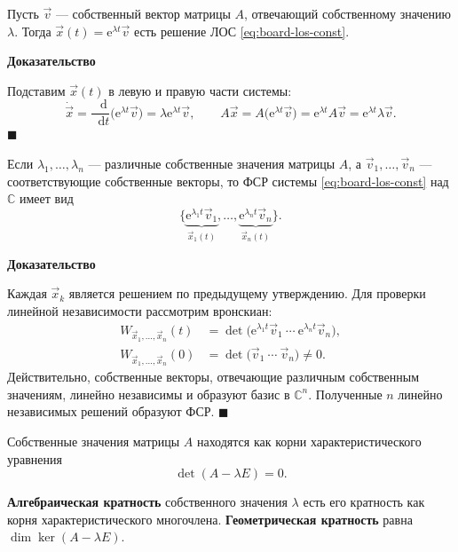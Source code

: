 \documentclass[12pt,a4paper]{article}
\numberwithin{equation}{section}
\newcommand{\vect}[1]{\vec{#1}}
\newcommand{\e}{\mathrm{e}}
\newcommand{\dd}{\mathop{}\!\mathrm{d}}
\renewenvironment{proof}[1][Доказательство]{\begin{center}\textbf{#1}\end{center}}{\hfill$\blacksquare$\par}
\begin{document}
\begin{theoremHSE}
Пусть $\vect v$ --- собственный вектор матрицы $A$, отвечающий
собственному значению $\lambda$. Тогда $\vect{x}(t)=\e^{\lambda t}\vect v$
есть решение ЛОС \eqref{eq:board-los-const}.
\end{theoremHSE}

\begin{proof}
Подставим $\vect{x}(t)$ в левую и правую части системы:
\[
 \dot{\vect{x}}=\frac{\dd}{\dd t}\bigl(\e^{\lambda t}\vect v\bigr)
 =\lambda\e^{\lambda t}\vect v,\qquad
 A\vect{x}=A\bigl(\e^{\lambda t}\vect v\bigr)
 =\e^{\lambda t}A\vect v=\e^{\lambda t}\lambda\vect v.
\]
\end{proof}

\begin{theoremHSE}
Если $\lambda_1,\ldots,\lambda_n$ --- различные собственные значения
матрицы $A$, а $\vect v_1,\ldots,\vect v_n$ --- соответствующие собственные
векторы, то ФСР системы \eqref{eq:board-los-const} над $\mathbb C$ имеет вид
\[
 \bigl\{\underbrace{\e^{\lambda_1t}\vect v_1}_{\vect{x}_1(t)},\ldots,
        \underbrace{\e^{\lambda_nt}\vect v_n}_{\vect{x}_n(t)}\bigr\}.
\]
\end{theoremHSE}

\begin{proof}
Каждая $\vect{x}_k$ является решением по предыдущему утверждению.
Для проверки линейной независимости рассмотрим вронскиан:
\[
 \begin{aligned}
 W_{\vect{x}_1,\ldots,\vect{x}_n}(t)
   &=\det\bigl(\e^{\lambda_1t}\vect v_1\ \cdots\ \e^{\lambda_nt}\vect v_n\bigr),\\
 W_{\vect{x}_1,\ldots,\vect{x}_n}(0)
   &=\det\bigl(\vect v_1\ \cdots\ \vect v_n\bigr)\ne0 .
 \end{aligned}
\]
Действительно, собственные векторы, отвечающие различным собственным
значениям, линейно независимы и образуют базис в $\mathbb C^n$.
Полученные $n$ линейно независимых решений образуют ФСР.
\end{proof}

Собственные значения матрицы $A$ находятся как корни характеристического
уравнения
\[
 \det(A-\lambda E)=0.
\]

\begin{definitionHSE}
\textbf{Алгебраическая кратность} собственного значения $\lambda$ есть
его кратность как корня характеристического многочлена.
\textbf{Геометрическая кратность} равна $\dim\ker(A-\lambda E)$.
\end{definitionHSE}
\end{document}
